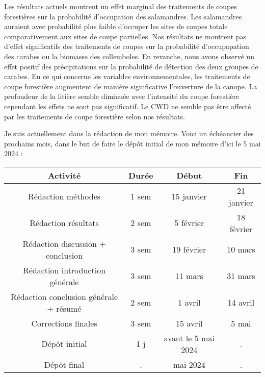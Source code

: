 \documentclass[12pt, letterpaper]{article}
\begin{document}
Les résultats actuels montrent un effet marginal des traitements de coupes forestières sur la probabilité d'occupation des salamandres.
Les salamandres auraient avec probabilité plus faible d'occuper les sites de coupes totale comparativement aux sites de coupe partielles. 
Nos résultats ne montrent pas d'effet significatifs des traitements de coupes sur la probabilité d'occupapation des carabes ou la biomasse des collemboles.
En revanche, nous avons observé un effet positif des précipitations sur la probabilité de détection des deux groupes de carabes. 
En ce qui concerne les variables environnementales, les traitements de coupe forestière augmentent de manière significative l'ouverture de la canope.  
La profondeur de la litière semble diminuée avec l'intensité du coupe forestière cependant les effets ne sont pas significatif.
Le CWD ne semble pas être affecté par les traitements de coupe forestière selon nos résultats.\\

\pagebreak

Je suis actuellement dans la rédaction de mon mémoire. 
Voici un échéancier des prochains mois, dans le but de faire le dépôt initial de mon mémoire d’ici le 5 mai 2024 :



    \begin{center}
        \begin{tabular}{|c c c c|} 
            \hline
            Activité & Durée & Début & Fin \\ [0.5ex] 
            \hline\hline
            Rédaction méthodes & 1 sem & 15 janvier & 21 janvier \\ 
            \hline
            Rédaction résultats & 2 sem & 5 février & 18 février \\
            \hline
            Rédaction discussion + conclusion & 3 sem & 19 février & 10 mars \\
            \hline
            Rédaction introduction générale & 3 sem & 11 mars & 31 mars \\
            \hline
            Rédaction conclusion générale + résumé & 2 sem & 1 avril & 14 avril \\ 
            \hline
            Corrections finales & 3 sem & 15 avril & 5 mai \\
            \hline
            Dépôt initial & 1 j & avant le 5 mai 2024 & . \\
            \hline
            Dépôt final & .& mai 2024 & . \\ 
            \hline
        \end{tabular}
    \end{center}
    
\end{document}
